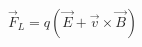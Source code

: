 \documentclass[preview]{standalone}
\begin{document}
\begin{align*}
\vec{F}_L = q(\vec{E} + \vec{v} \times \vec{B})
\end{align*}
\end{document}
